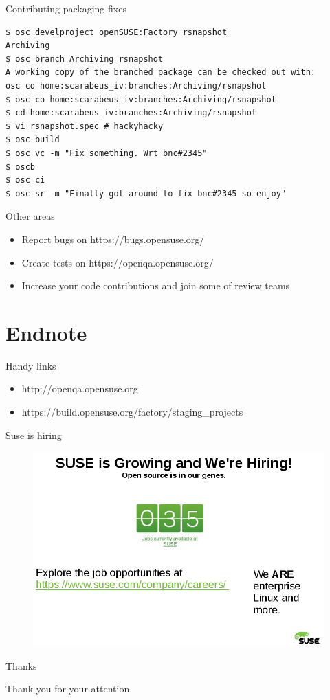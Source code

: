 \documentclass{beamer}
\begin{document}
\begin{frame}[fragile]{Contributing packaging fixes}
        \begin{tiny}
        \begin{verbatim}
$ osc develproject openSUSE:Factory rsnapshot
Archiving
$ osc branch Archiving rsnapshot
A working copy of the branched package can be checked out with:
osc co home:scarabeus_iv:branches:Archiving/rsnapshot
$ osc co home:scarabeus_iv:branches:Archiving/rsnapshot
$ cd home:scarabeus_iv:branches:Archiving/rsnapshot
$ vi rsnapshot.spec # hackyhacky
$ osc build
$ osc vc -m "Fix something. Wrt bnc#2345"
$ oscb
$ osc ci
$ osc sr -m "Finally got around to fix bnc#2345 so enjoy"
        \end{verbatim}
        \end{tiny}
\end{frame}

\begin{frame}[t]{Other areas}
	\begin{itemize}
	\item Report bugs on https://bugs.opensuse.org/
	\item Create tests on https://openqa.opensuse.org/
	\item Increase your code contributions and join some of review teams
	\end{itemize}
\end{frame}

\section{Endnote}

\begin{frame}{Handy links}
	\begin{itemize}
	\item http://openqa.opensuse.org
	\item https://build.opensuse.org/factory/staging\_projects
	\end{itemize}
\end{frame}

\begin{frame}{Suse is hiring}
	\begin{figure}
	\includegraphics[width= 0.8\linewidth]{suse_hiring.png}
	\end{figure}
\end{frame}

\begin{frame}{Thanks}
	\begin{center}
	Thank you for your attention.
	\end{center}
\end{frame}
\end{document}
